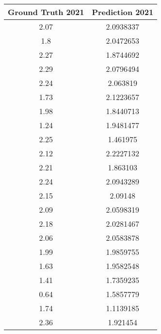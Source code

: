 \begin{table}[]
    \begin{tabular}{|c|c|}
    \hline
    \textbf{Ground Truth 2021} & \textbf{Prediction 2021} \\ \hline
    2.07                       & 2.0938337                \\ \hline
    1.8                        & 2.0472653                \\ \hline
    2.27                       & 1.8744692                \\ \hline
    2.29                       & 2.0796494                \\ \hline
    2.24                       & 2.063819                 \\ \hline
    1.73                       & 2.1223657                \\ \hline
    1.98                       & 1.8440713                \\ \hline
    1.24                       & 1.9481477                \\ \hline
    2.25                       & 1.461975                 \\ \hline
    2.12                       & 2.2227132                \\ \hline
    2.21                       & 1.863103                 \\ \hline
    2.24                       & 2.0943289                \\ \hline
    2.15                       & 2.09148                  \\ \hline
    2.09                       & 2.0598319                \\ \hline
    2.18                       & 2.0281467                \\ \hline
    2.06                       & 2.0583878                \\ \hline
    1.99                       & 1.9859755                \\ \hline
    1.63                       & 1.9582548                \\ \hline
    1.41                       & 1.7359235                \\ \hline
    0.64                       & 1.5857779                \\ \hline
    1.74                       & 1.1139185                \\ \hline
    2.36                       & 1.921454                 \\ \hline

\end{tabular}
\end{table}
